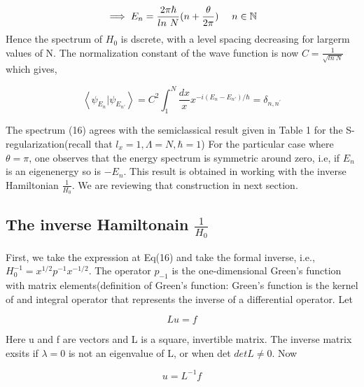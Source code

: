 \documentclass[12pt, letterpaper]{article}
\newcommand*{\1}{\hspace{1pt}}
\begin{document}
        \begin{equation}
            \implies E_{n}  = \frac{2\pi\hbar}{ln \ N}(n+\frac{\theta}{2\pi})  \ \ \ \ n \in \mathbb{N}\\
        \end{equation}
        Hence the spectrum of $H_{0}$ is dscrete, with a level spacing decreasing for largerm values of N. The normalization constant of the wave function is now 
        $C = \frac{1}{\sqrt{ln \ N}}$ which gives,

        \begin{equation}
            \left\langle\psi_{E_{n}}|\psi_{E_{n'}}\right\rangle = C^{2} \int_{1}^{N} \frac{dx}{x} x^{-i(E_{n}-E_{n'})/\hbar} = \delta_{n,n^{'}}
        \end{equation}
        
        The spectrum (16) agrees with the semiclassical result given in Table 1 for the S-regularization(recall that $l_{x} = 1, \Lambda = N, \hbar=1$)
        For the particular case where $\theta=\pi$, one observes that the energy spectrum is symmetric around zero, i.e, if $E_{n}$ is an eigenenergy so is $-E_{n}$.
        This result is obtained in working\cite{s10} with the inverse Hamiltonian $\frac{1}{H_{0}}$. We are reviewing that construction in next section.

        \subsection{The inverse Hamiltonain $\frac{1}{H_{0}}$}

        First, we take the expression at Eq(16) and take the formal inverse, i.e., $H_{0} ^{-1} = x^{1/2}p^{-1}x^{-1/2}$. The operator $p_{-1}$ is the one-dimensional
        Green's function with matrix elements(definition of Green's function: Green's function is the kernel of and integral operator that represents the inverse
        of a differential operator. Let 

        \begin{equation}
                Lu = f
        \end{equation}

        Here u and f are vectors and L is a square, invertible matrix. The inverse matrix exsits if $\lambda=0$ is not an eigenvalue of L, or when det $det L \neq 0$.
        Now

        \begin{equation}
            u = L^{-1}f
        \end{equation}
\end{document}
